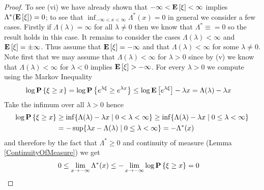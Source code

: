 \begin{proof}
To see (vi) we have already shown that $-\infty < \textbf{E}\left[\xi\right] < \infty$ implies $\Lambda^*(\textbf{E}\left[\xi\right]) = 0$; to see that $\inf_{-\infty < x < \infty} \Lambda^*(x) = 0$ in general we consider a few cases.  Firstly if $\Lambda(\lambda) = \infty$ for all $\lambda \neq 0$ then we know that $\Lambda^* \equiv = 0$ so the result holds in this case.  It remains to consider the cases $\Lambda(\lambda) < \infty$ and $\textbf{E}\left[\xi\right] = \pm \infty$.   Thus assume that $\textbf{E}\left[\xi\right] = -\infty$ and that $\Lambda(\lambda) < \infty$ for 
some $\lambda \neq 0$.  Note first that we may assume that $\Lambda(\lambda) < \infty$ for $\lambda > 0$ since by (v) we know that $\Lambda(\lambda) < \infty$ for $\lambda < 0$ implies $\textbf{E}\left[\xi\right] > -\infty$.  For every $\lambda > 0$ we compute using the Markov Inequality
\begin{align*}
\log \textbf{P}\left \{\xi \geq x \right \} &= \log \textbf{P}\left \{e^{\lambda \xi} \geq e^{\lambda x} \right \} \leq \log \textbf{E}\left[e^{\lambda \xi}\right] - \lambda x = \Lambda (\lambda) - \lambda x
\end{align*}
Take the infimum over all $\lambda > 0$ hence
\begin{align*}
\log \textbf{P}\left \{\xi \geq x \right \} &\geq \inf \lbrace \Lambda (\lambda) - \lambda x \mid 0 < \lambda < \infty \rbrace \geq \inf \lbrace \Lambda (\lambda) - \lambda x \mid 0 \leq \lambda  < \infty \rbrace\\
&= - \sup \lbrace \lambda x - \Lambda (\lambda) \mid 0 \leq \lambda < \infty \rbrace = -\Lambda^*(x)
\end{align*}
and therefore by the fact that $\Lambda^* \geq 0$ and continuity of measure (Lemma \ref{ContinuityOfMeasure}) we get
\begin{align*}
0 &\leq \lim_{x \to -\infty} \Lambda^*(x) \leq -\lim_{x \to -\infty} \log \textbf{P}\left \{\xi \geq x \right \} = 0
\end{align*}


\end{proof}
